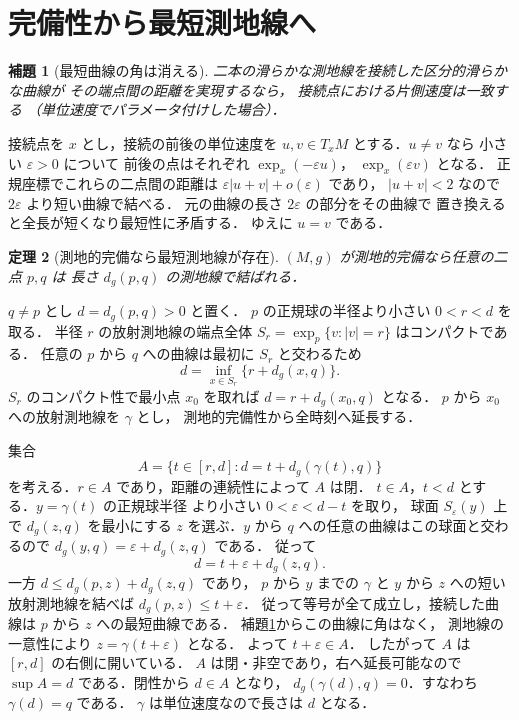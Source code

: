 \documentclass[a5paper,10pt,onecolumn]{jsarticle}
\makeatletter
\theoremstyle{mathnotetheorem}
\newtheorem{theorem}{定理}[section]
\newtheorem{lemma}[theorem]{補題}
\renewcommand{\proofname}{証明}
\renewenvironment{proof}[1][\proofname]{%
  \par\pushQED{\qed}\normalfont\topsep4\p@\@plus2\p@\relax
  \trivlist\item[\hskip\labelsep\bfseries #1]\ignorespaces
}{\popQED\endtrivlist\@endpefalse}
\makeatother
\begin{document}
\section{完備性から最短測地線へ}
\begin{lemma}[最短曲線の角は消える]\label{lem:corner}
二本の滑らかな測地線を接続した区分的滑らかな曲線が
その端点間の距離を実現するなら，
接続点における片側速度は一致する
（単位速度でパラメータ付けした場合）．
\end{lemma}
\begin{proof}
接続点を $x$ とし，接続の前後の単位速度を
$u,v\in T_xM$ とする．$u\ne v$ なら
小さい $\varepsilon>0$ について
前後の点はそれぞれ
$\exp_x(-\varepsilon u)$，
$\exp_x(\varepsilon v)$ となる．
正規座標でこれらの二点間の距離は
$\varepsilon|u+v|+o(\varepsilon)$ であり，
$|u+v|<2$ なので $2\varepsilon$ より短い曲線で結べる．
元の曲線の長さ $2\varepsilon$ の部分をその曲線で
置き換えると全長が短くなり最短性に矛盾する．
ゆえに $u=v$ である．
\end{proof}
\begin{theorem}[測地的完備なら最短測地線が存在]
\label{thm:reach}
$(M,g)$ が測地的完備なら任意の二点 $p,q$ は
長さ $d_g(p,q)$ の測地線で結ばれる．
\end{theorem}
\begin{proof}
$q\ne p$ とし $d=d_g(p,q)>0$ と置く．
$p$ の正規球の半径より小さい $0<r<d$ を取る．
半径 $r$ の放射測地線の端点全体
$S_r=\exp_p\{v:|v|=r\}$ はコンパクトである．
任意の $p$ から $q$ への曲線は最初に $S_r$ と交わるため
\[
 d=\inf_{x\in S_r}\{r+d_g(x,q)\}.
\]
$S_r$ のコンパクト性で最小点 $x_0$ を取れば
$d=r+d_g(x_0,q)$ となる．
$p$ から $x_0$ への放射測地線を $\gamma$ とし，
測地的完備性から全時刻へ延長する．

集合
\[
 A=\{t\in[r,d]:d=t+d_g(\gamma(t),q)\}
\]
を考える．$r\in A$ であり，距離の連続性によって $A$ は閉．
$t\in A$，$t<d$ とする．$y=\gamma(t)$ の正規球半径
より小さい $0<\varepsilon<d-t$ を取り，
球面 $S_\varepsilon(y)$ 上で $d_g(z,q)$ を最小にする
$z$ を選ぶ．$y$ から $q$ への任意の曲線はこの球面と交わるので
$d_g(y,q)=\varepsilon+d_g(z,q)$ である．
従って
\[
 d=t+\varepsilon+d_g(z,q).
\]
一方 $d\le d_g(p,z)+d_g(z,q)$ であり，
$p$ から $y$ までの $\gamma$ と
$y$ から $z$ への短い放射測地線を結べば
$d_g(p,z)\le t+\varepsilon$．
従って等号が全て成立し，接続した曲線は
$p$ から $z$ への最短曲線である．
補題\ref{lem:corner}からこの曲線に角はなく，
測地線の一意性により $z=\gamma(t+\varepsilon)$ となる．
よって $t+\varepsilon\in A$．
したがって $A$ は $[r,d]$ の右側に開いている．
$A$ は閉・非空であり，右へ延長可能なので
$\sup A=d$ である．閉性から $d\in A$ となり，
$d_g(\gamma(d),q)=0$．すなわち $\gamma(d)=q$ である．
$\gamma$ は単位速度なので長さは $d$ となる．
\end{proof}
\end{document}

